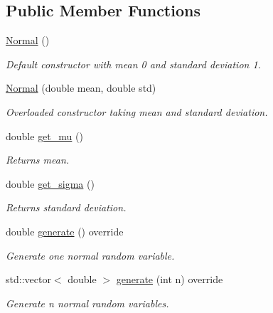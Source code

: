 \subsection*{Public Member Functions}
\begin{DoxyCompactItemize}
\item 
\mbox{\label{class_normal_af62e51ec40dc2eedc3b9ca49ebdc7197}} 
\hyperlink{class_normal_af62e51ec40dc2eedc3b9ca49ebdc7197}{Normal} ()
\begin{DoxyCompactList}\small\item\em Default constructor with mean 0 and standard deviation 1. \end{DoxyCompactList}\item 
\mbox{\label{class_normal_aa1c65330d29f9d34a3c35e01371a5a0c}} 
\hyperlink{class_normal_aa1c65330d29f9d34a3c35e01371a5a0c}{Normal} (double mean, double std)
\begin{DoxyCompactList}\small\item\em Overloaded constructor taking mean and standard deviation. \end{DoxyCompactList}\item 
\mbox{\label{class_normal_aa28b93c40d959490fdb7e944cfb53ce5}} 
double \hyperlink{class_normal_aa28b93c40d959490fdb7e944cfb53ce5}{get\+\_\+mu} ()
\begin{DoxyCompactList}\small\item\em Returns mean. \end{DoxyCompactList}\item 
\mbox{\label{class_normal_ab0fb264168e878f12d2a9eddbfefda79}} 
double \hyperlink{class_normal_ab0fb264168e878f12d2a9eddbfefda79}{get\+\_\+sigma} ()
\begin{DoxyCompactList}\small\item\em Returns standard deviation. \end{DoxyCompactList}\item 
\mbox{\label{class_normal_ace26d5def9f3a3fb469408a4f38ad37d}} 
double \hyperlink{class_normal_ace26d5def9f3a3fb469408a4f38ad37d}{generate} () override
\begin{DoxyCompactList}\small\item\em Generate one normal random variable. \end{DoxyCompactList}\item 
\mbox{\label{class_normal_a0618904d563dbb1baae5441abc8677a2}} 
std\+::vector$<$ double $>$ \hyperlink{class_normal_a0618904d563dbb1baae5441abc8677a2}{generate} (int n) override
\begin{DoxyCompactList}\small\item\em Generate n normal random variables. \end{DoxyCompactList}\end{DoxyCompactItemize}
